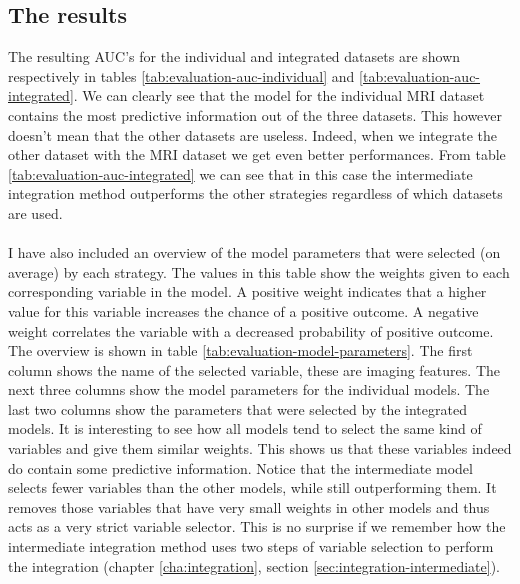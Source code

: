 \subsection{The results}
The resulting AUC's for the individual and integrated datasets are shown respectively in tables \ref{tab:evaluation-auc-individual} and \ref{tab:evaluation-auc-integrated}. We can clearly see that the model for the individual MRI dataset contains the most predictive information out of the three datasets. This however doesn't mean that the other datasets are useless. Indeed, when we integrate the other dataset with the MRI dataset we get even better performances. From table \ref{tab:evaluation-auc-integrated} we can see that in this case the intermediate integration method outperforms the other strategies regardless of which datasets are used. \\ \\
I have also included an overview of the model parameters that were selected (on average) by each strategy. The values in this table show the weights given to each corresponding variable in the model. A positive weight indicates that a higher value for this variable increases the chance of a positive outcome. A negative weight correlates the variable with a decreased probability of positive outcome. The overview is shown in table \ref{tab:evaluation-model-parameters}. The first column shows the name of the selected variable, these are imaging features. The next three columns show the model parameters for the individual models. The last two columns show the parameters that were selected by the integrated models. It is interesting to see how all models tend to select the same kind of variables and give them similar weights. This shows us that these variables indeed do contain some predictive information. Notice that the intermediate model selects fewer variables than the other models, while still outperforming them. It removes those variables that have very small weights in other models and thus acts as a very strict variable selector. This is no surprise if we remember how the intermediate integration method uses two steps of variable selection to perform the integration (chapter \ref{cha:integration}, section \ref{sec:integration-intermediate}).


